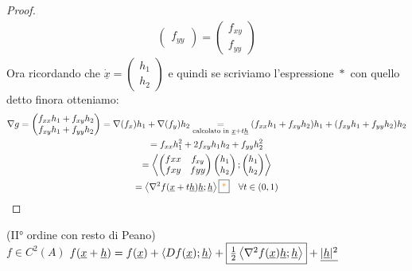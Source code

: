 \documentclass[a4paper, oneside]{article}
\begin{document}
\begin{proof}
\begin{gather*}
\begin{pmatrix}
                    f_{yy}
                \end{pmatrix} = \begin{pmatrix}
                    f_{xy}\\
                    f_{yy}
                \end{pmatrix}
            \end{gather*}
            Ora ricordando che $\dot{\underline{x}} = \begin{pmatrix} h_1 \\ h_2 \end{pmatrix}$ e quindi se scriviamo l'espressione $\boxed{*}$ con quello detto finora otteniamo:
            \begin{gather*}
                \nabla g = \begin{pmatrix}
                    f_{xx} h_1+ f_{xy}h_2\\
                    f_{xy} h_1 + f_{yy}h_2
                \end{pmatrix}
                = \nabla(f_x)h_1 + \nabla(f_y)h_2
            \underset{\text{calcolato in }\underline{x} +t \underline{h}}{=} (f_{xx} h_1 + f_{xy}h_2)h_1 +(f_{xy} h_1 + f_{yy}h_2)h_2\\
            = f_{xx} h_1^2 + 2f_{xy}h_1 h_2 + f_{yy}h_2^2 \\
            = \left\langle \begin{pmatrix}
                f{xx} & f_{xy}\\
                f{xy} & f{yy}
            \end{pmatrix}
            \begin{pmatrix}
                h_1\\h_2
            \end{pmatrix};\begin{pmatrix}
                h_1\\h_2
            \end{pmatrix}\right\rangle \\
            = \left\langle \nabla^2f(\underline{x} + t \underline{h})\underline{h} ; \underline{h}\right\rangle \text{\fbox{\textcolor{orange}{*}}} \quad \forall t \in (0,1)
            \end{gather*}
        \end{proof}


        \begin{theorem}
            (II° ordine con resto di Peano)\\
         $f \in C^2(A)$  $f(\underline{x}+ \underline{h}) = f(\underline{x}) + \left\langle Df(\underline{x}); \underline{h} \right\rangle + \text{\fbox{$\frac{1}{2}\left\langle \nabla^2f(\underline{x})\underline{h};\underline{h} \right\rangle $}} + \underline{ | \underline{h} | ^2}$ 
        \end{theorem}
\end{document}
